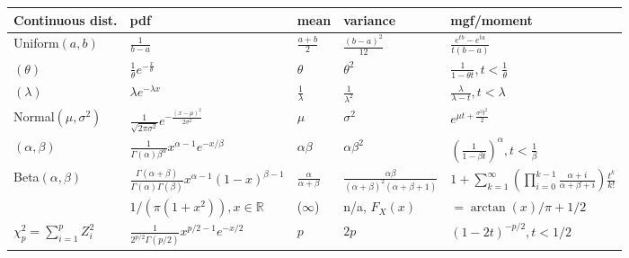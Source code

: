 \documentclass[a4paper, landscape,10pt]{article}
\begin{document}
\begin{multicols}{2}
		\begin{tabular}{lllll}
			\toprule
			Continuous dist. & pdf & mean & variance & mgf/moment \\
			\midrule
			{Uniform}$(a, b)$ & $\displaystyle\frac{1}{b-a}$ & $\displaystyle\frac{a+b}{2}$ & $\displaystyle\frac{(b-a)^2}{12}$ & $\displaystyle\frac{e^{tb}-e^{ta}}{t(b-a)}$ \\
			\rowcolor{gray!15}{Exponential}$(\theta)$ & $\displaystyle\frac{1}{\theta}e^{-\frac{x}{\theta}}$ & $\theta$ & $\theta^2$ & $\displaystyle\frac{1}{1-\theta t}, t < \frac{1}{\theta}$ \\
			\rowcolor{gray!15}{Exponential}$(\lambda)$ & $\lambda e^{-\lambda x}$ & $\displaystyle\frac{1}{\lambda}$ & $\displaystyle\frac{1}{\lambda^2}$ & $\displaystyle\frac{\lambda}{\lambda-t}, t < \lambda$ \\
			{Normal}$(\mu, \sigma^2)$ & \large{$\displaystyle\frac{1}{\sqrt{2\pi\sigma^2}}e^{-\frac{(x-\mu)^2}{2\sigma^2}}$} & $\mu$ & $\sigma^2$ & $e^{\mu t + \frac{\sigma^2 t^2}{2}}$ \\
			\rowcolor{gray!15}{Gamma}$(\alpha, \beta)$ & $\displaystyle\frac{1}{\Gamma(\alpha)\beta^\alpha}x^{\alpha-1}e^{-x / \beta}$ & $\alpha\beta$ & $\alpha\beta^2$ & $\displaystyle\left(\frac{1}{1-\beta t}\right)^\alpha, t < \frac{1}{\beta}$ \\
			{Beta}$(\alpha, \beta)$ & $\displaystyle \frac{\Gamma(\alpha+\beta)}{\Gamma(\alpha)\Gamma(\beta)}x^{\alpha-1}(1-x)^{\beta-1}$ & $\displaystyle \frac{\alpha}{\alpha+\beta}$ & $ \frac{\alpha\beta}{(\alpha+\beta)^2(\alpha+\beta+1)}$ & $1 + \sum_{k=1}^{\infty} \left(\prod_{i=0}^{k-1} \frac{\alpha+i}{\alpha+\beta+i}\right) \frac{t^k}{k!}$ \\
			\rowcolor{gray!15}{Cauchy} & $1 / \left( \pi (1 + x ^ 2)\right), x \in \mathbb R $ & ($\infty$) & n/a, \;\; $F_X(x)$ & $= \arctan(x)/\pi + 1/2$\\
			{$\chi^2_p = \sum_{i = 1}^p Z_i^2$} & $\displaystyle \frac{1}{2^{p/2}\Gamma(p/2)}x^{p/2-1}e^{-x/2}$ & $p$ & $2p$ & $(1-2t)^{-p/2}, t < 1/2$ \\
			\bottomrule
		\end{tabular}
	\end{multicols}
\end{document}
